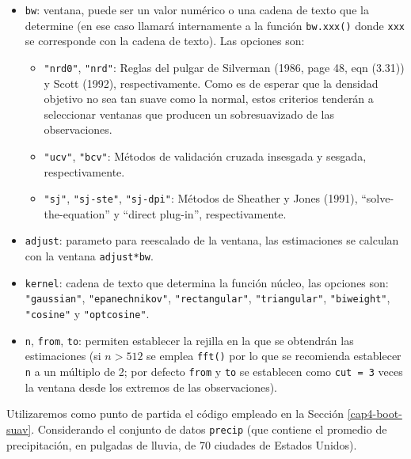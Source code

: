 \documentclass[
]{book}
\theoremstyle{definition}
\theoremstyle{definition}
\theoremstyle{definition}
\theoremstyle{remark}
\begin{document}
\begin{itemize}
\item
  \texttt{bw}: ventana, puede ser un valor numérico o una cadena de texto que la determine
  (en ese caso llamará internamente a la función \texttt{bw.xxx()} donde \texttt{xxx} se corresponde
  con la cadena de texto). Las opciones son:

  \begin{itemize}
  \item
    \texttt{"nrd0"}, \texttt{"nrd"}: Reglas del pulgar de Silverman (1986, page 48, eqn (3.31)) y
    Scott (1992), respectivamente. Como es de esperar que la densidad objetivo
    no sea tan suave como la normal, estos criterios tenderán a seleccionar
    ventanas que producen un sobresuavizado de las observaciones.
  \item
    \texttt{"ucv"}, \texttt{"bcv"}: Métodos de validación cruzada insesgada y sesgada, respectivamente.
  \item
    \texttt{"sj"}, \texttt{"sj-ste"}, \texttt{"sj-dpi"}: Métodos de Sheather y Jones (1991),
    ``solve-the-equation'' y ``direct plug-in'', respectivamente.
  \end{itemize}
\item
  \texttt{adjust}: parameto para reescalado de la ventana, las estimaciones se calculan
  con la ventana \texttt{adjust*bw}.
\item
  \texttt{kernel}: cadena de texto que determina la función núcleo, las opciones son: \texttt{"gaussian"},
  \texttt{"epanechnikov"}, \texttt{"rectangular"}, \texttt{"triangular"}, \texttt{"biweight"}, \texttt{"cosine"} y \texttt{"optcosine"}.
\item
  \texttt{n}, \texttt{from}, \texttt{to}: permiten establecer la rejilla en la que se obtendrán las estimaciones
  (si \(n>512\) se emplea \texttt{fft()} por lo que se recomienda establecer \texttt{n} a un múltiplo de 2;
  por defecto \texttt{from} y \texttt{to} se establecen como \texttt{cut\ =\ 3} veces la ventana desde los extremos
  de las observaciones).
\end{itemize}

Utilizaremos como punto de partida el código empleado en la Sección \ref{cap4-boot-suav}.
Considerando el conjunto de datos \texttt{precip} (que contiene el promedio de precipitación,
en pulgadas de lluvia, de 70 ciudades de Estados Unidos).
\end{document}
